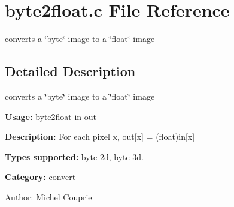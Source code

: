 \section{byte2float.c File Reference}
\label{byte2float_8c}
converts a \char`\"{}byte\char`\"{} image to a \char`\"{}float\char`\"{} image 



\subsection{Detailed Description}
converts a \char`\"{}byte\char`\"{} image to a \char`\"{}float\char`\"{} image 

{\bf Usage:} byte2float in out

{\bf Description:} For each pixel x, out[x] = (float)in[x]

{\bf Types supported:} byte 2d, byte 3d.

{\bf Category:} convert

\begin{Desc}
\item[Author:]Michel Couprie \end{Desc}
